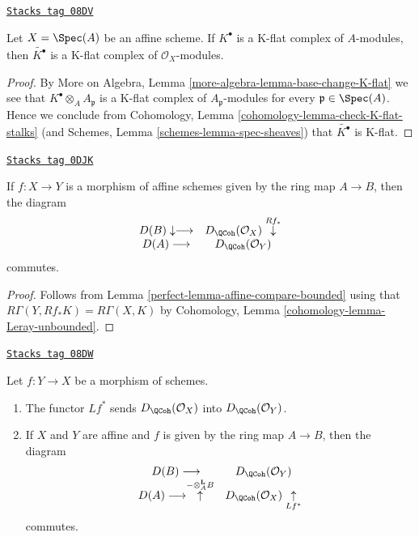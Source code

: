 \begin{lemma}
\label{perfect-lemma-affine-K-flat}
\href{https://stacks.math.columbia.edu/tag/08DV}{\texttt{Stacks tag 08DV}}

Let $X = \Spec(A)$ be an affine scheme. If $K^\bullet$ is a K-flat
complex of $A$-modules, then $\widetilde{K^\bullet}$ is a K-flat
complex of $\mathcal{O}_X$-modules.
\end{lemma}

\begin{proof}
By More on Algebra, Lemma \ref{more-algebra-lemma-base-change-K-flat}
we see that $K^\bullet \otimes_A A_\mathfrak p$ is a K-flat complex
of $A_\mathfrak p$-modules for every $\mathfrak p \in \Spec(A)$.
Hence we conclude from
Cohomology, Lemma \ref{cohomology-lemma-check-K-flat-stalks}
(and
Schemes, Lemma \ref{schemes-lemma-spec-sheaves})
that $\widetilde{K^\bullet}$ is K-flat.
\end{proof}

\begin{lemma}
\label{perfect-lemma-quasi-coherence-pushforward}
\href{https://stacks.math.columbia.edu/tag/0DJK}{\texttt{Stacks tag 0DJK}}

If $f : X \to Y$ is a morphism of affine schemes given by the ring map
$A \to B$, then the diagram
$$
\begin{array}{cc}D(B) \downarrow\longrightarrow & D_\QCoh(\mathcal{O}_X) \overset{Rf_*}{\downarrow} \\ D(A) \longrightarrow & D_\QCoh(\mathcal{O}_Y)\end{array}
$$
commutes.
\end{lemma}

\begin{proof}

Follows from Lemma \ref{perfect-lemma-affine-compare-bounded}
using that $R\Gamma(Y, Rf_*K) = R\Gamma(X, K)$ by
Cohomology, Lemma \ref{cohomology-lemma-Leray-unbounded}.
\end{proof}

\begin{lemma}
\label{perfect-lemma-quasi-coherence-pullback}
\href{https://stacks.math.columbia.edu/tag/08DW}{\texttt{Stacks tag 08DW}}

Let $f : Y \to X$ be a morphism of schemes.
\begin{enumerate}
\item The functor $Lf^*$ sends $D_\QCoh(\mathcal{O}_X)$
into $D_\QCoh(\mathcal{O}_Y)$.
\item If $X$ and $Y$ are affine and $f$ is given by the ring map
$A \to B$, then the diagram
$$
\begin{array}{cc}D(B) \longrightarrow & D_\QCoh(\mathcal{O}_Y) \\ D(A) \longrightarrow\overset{- \otimes_A^\mathbf{L} B}{\uparrow} & D_\QCoh(\mathcal{O}_X) \underset{Lf^*}{\uparrow}\end{array}
$$
commutes.
\end{enumerate}
\end{lemma}

